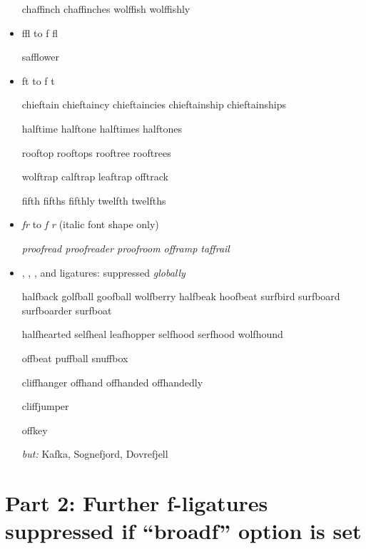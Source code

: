 \begin{itemize}
chaffinch chaffinches wolffish wolffishly



\item ffl to f\kern0pt fl

safflower



\item ft to f\kern0pt t

chieftain chieftaincy chieftaincies chieftainship chieftainships

halftime halftone halftimes halftones

rooftop rooftops rooftree rooftrees

wolftrap calftrap leaftrap offtrack

fifth fifths fifthly twelfth twelfths



\item \emph{fr} to \emph{f\kern0pt r} (italic font shape only)

\emph{proofread proofreader proofroom offramp taffrail}



\item { \ebg {}, , , and  ligatures}: suppressed \emph{globally}

halfback golfball goofball wolfberry halfbeak hoofbeat surfbird surfboard surfboarder surfboat

halfhearted selfheal leafhopper selfhood serfhood wolfhound

offbeat puffball snuffbox

cliffhanger offhand offhanded offhandedly

cliffjumper

offkey

\emph{but:} {\ebg Kafka, Sognefjord, Dovrefjell}

\end{itemize}



\section*{Part 2: Further f-ligatures suppressed if ``broadf'' option is set}

